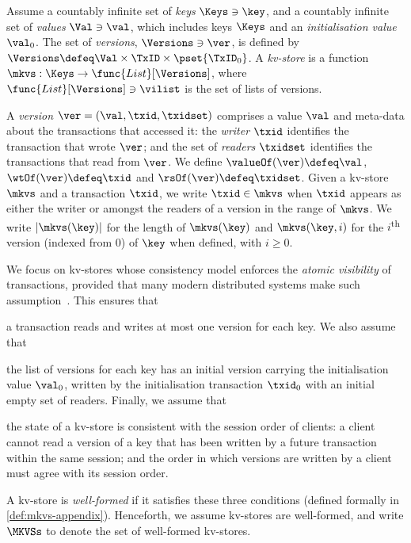 \begin{definition}[Kv-stores]
\label{def:his_heap}
\label{def:mkvs}
Assume a countably infinite set of \emph{keys} $\Keys \ni \key$, 
and a countably infinite set of  \emph{values} $\Val \ni \val$, 
which includes keys \( \Keys \) and an \emph{initialisation value} $\val_0$.
The set of \emph{versions}, $\Versions \ni \ver$, is defined by $\Versions \defeq \Val \times \TxID \times \pset{\TxID_{0}}$. 
A \emph{kv-store} 
is a function $\mkvs: \Keys \to \func{List}[\Versions]$, 
where $\func{List}[\Versions] \ni \vilist$ is the set of lists of versions. %
\end{definition}

A \emph{version} $\ver = (\val, \txid, \txidset)$ comprises  a value $\val$
and meta-data about the transactions that accessed it: the \emph{writer} $\txid$ identifies the transaction that wrote $\ver$;
and the set of \emph{readers} $\txidset$ identifies  the  transactions
that read from  $\ver$.
We define $\valueOf(\ver) \defeq \val$,
$\wtOf(\ver) \defeq \txid$ and $\rsOf(\ver) \defeq \txidset$. 
Given a kv-store $\mkvs$ and a transaction $\txid$, we write 
$\txid \in \mkvs$ when $\txid$ appears as either the writer or amongst the readers of a version in the range of $\mkvs$.
We write $\lvert \mkvs(\key) \rvert$ for the length of $\mkvs(\key)$
and $\mkvs(\key, i)$ for the $i$\textsuperscript{th} version (indexed from 0) of $\key$ when defined, with $i \geq 0$.


We focus on kv-stores whose consistency model enforces the \emph{atomic visibility} of transactions,
provided that many modern distributed systems make such assumption~\cite{ramp,rola,cops,wren,redblue,PSI,NMSI,gdur,clocksi,distrsi}.
This ensures that 
\begin{enumerate*}
	\item a transaction reads and writes at most one version for each key.
We also assume that 
	\item the list of versions for each key has an initial version 
carrying the initialisation value $\val_0$,  written by the 
initialisation transaction $\txid_0$ 
with an initial empty set of readers.
Finally, we assume that 
	\item the state of a kv-store is consistent with 
the session order of clients: a client cannot read a version of a key that has 
been written by a future transaction within the same session;  and 
the order in which versions are written by a client must agree 
with its session order. 
\end{enumerate*}
A kv-store is \emph{well-formed} if it satisfies these three conditions (defined formally in \cref{def:mkvs-appendix}). 
Henceforth, we assume kv-stores are well-formed, and write  $\MKVSs$ to denote 
the set of well-formed kv-stores.

